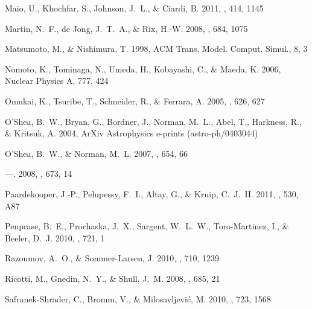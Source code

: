 \documentclass[apj]{emulateapj}
\begin{document}
\begin{thebibliography}{108}
{Maio}, U., {Khochfar}, S., {Johnson}, J.~L., \& {Ciardi}, B. 2011, \mnras,
  414, 1145

{Martin}, N.~F., {de Jong}, J.~T.~A., \& {Rix}, H.-W. 2008, \apj, 684, 1075

Matsumoto, M., \& Nishimura, T. 1998, ACM Trans. Model. Comput. Simul., 8, 3

{Nomoto}, K., {Tominaga}, N., {Umeda}, H., {Kobayashi}, C., \& {Maeda}, K.
  2006, Nuclear Physics A, 777, 424

{Omukai}, K., {Tsuribe}, T., {Schneider}, R., \& {Ferrara}, A. 2005, \apj, 626,
  627

{O'Shea}, B.~W., {Bryan}, G., {Bordner}, J., {Norman}, M.~L., {Abel}, T.,
  {Harkness}, R., \& {Kritsuk}, A. 2004, ArXiv Astrophysics e-prints
  (astro-ph/0403044)

{O'Shea}, B.~W., \& {Norman}, M.~L. 2007, \apj, 654, 66

---. 2008, \apj, 673, 14

{Paardekooper}, J.-P., {Pelupessy}, F.~I., {Altay}, G., \& {Kruip}, C.~J.~H.
  2011, \aap, 530, A87

{Penprase}, B.~E., {Prochaska}, J.~X., {Sargent}, W.~L.~W., {Toro-Martinez},
  I., \& {Beeler}, D.~J. 2010, \apj, 721, 1

{Razoumov}, A.~O., \& {Sommer-Larsen}, J. 2010, \apj, 710, 1239

{Ricotti}, M., {Gnedin}, N.~Y., \& {Shull}, J.~M. 2008, \apj, 685, 21

{Safranek-Shrader}, C., {Bromm}, V., \& {Milosavljevi{\'c}}, M. 2010, \apj,
  723, 1568


\end{thebibliography}
\end{document}
